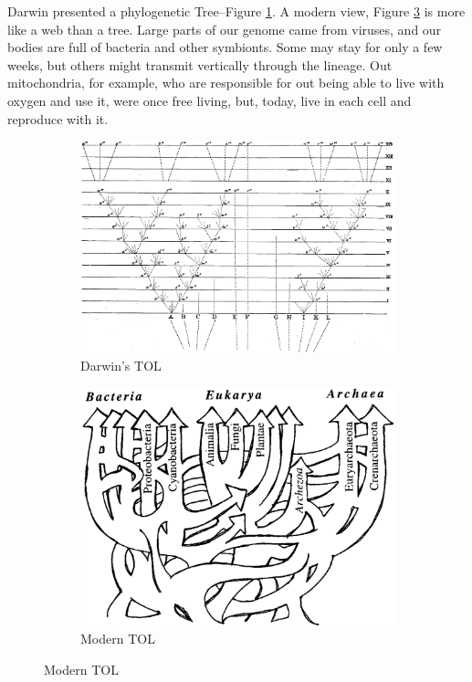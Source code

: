 \documentclass[]{article}
\begin{document}
Darwin presented a phylogenetic Tree--Figure \ref{fig:TOL:Darwin}. A modern view, Figure \ref{fig:TOL:Modern} is more like a web than a tree. Large parts of our genome came from viruses, and our bodies are full of bacteria and other symbionts. Some may stay for only a few weeks, but others might transmit vertically through the lineage. Out mitochondria, for example, who are responsible for out being able to live with oxygen and use it, were once free living, but, today, live in each cell and reproduce with it.

\begin{figure}[H]
	\caption{Two views of the Tree of Life}
	\begin{subfigure}[b]{0.45\textwidth}
		\caption{Darwin's TOL\cite{darwin1859origin}}\label{fig:TOL:Darwin}
		\includegraphics[width=\textwidth]{TOL_Darwin}
	\end{subfigure}
	\begin{subfigure}[b]{0.45\textwidth}
		\caption{Modern TOL}\label{fig:TOL:Modern}
		\includegraphics[width=\textwidth]{TOL-5-6}
	\end{subfigure}
\end{figure}
\end{document}
